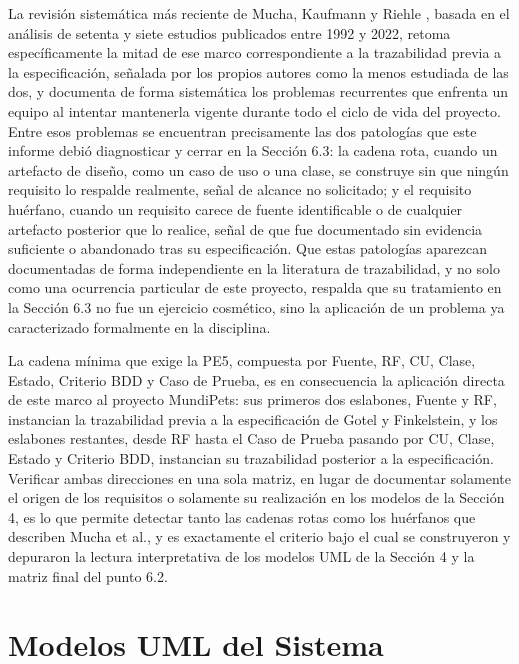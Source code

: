 \documentclass[journal,onecolumn]{IEEEtran}
\begin{document}
La revisión sistemática más reciente de Mucha, Kaufmann y Riehle
\cite{mucha2024}, basada en el análisis de setenta y siete estudios
publicados entre 1992 y 2022, retoma específicamente la mitad de ese
marco correspondiente a la trazabilidad previa a la especificación,
señalada por los propios autores como la menos estudiada de las dos, y
documenta de forma sistemática los problemas recurrentes que enfrenta un
equipo al intentar mantenerla vigente durante todo el ciclo de vida del
proyecto. Entre esos problemas se encuentran precisamente las dos
patologías que este informe debió diagnosticar y cerrar en la Sección
6.3: la cadena rota, cuando un artefacto de diseño, como un caso de uso
o una clase, se construye sin que ningún requisito lo respalde
realmente, señal de alcance no solicitado; y el requisito huérfano,
cuando un requisito carece de fuente identificable o de cualquier
artefacto posterior que lo realice, señal de que fue documentado sin
evidencia suficiente o abandonado tras su especificación. Que estas
patologías aparezcan documentadas de forma independiente en la
literatura de trazabilidad, y no solo como una ocurrencia particular de
este proyecto, respalda que su tratamiento en la Sección 6.3 no fue un
ejercicio cosmético, sino la aplicación de un problema ya caracterizado
formalmente en la disciplina.

La cadena mínima que exige la PE5, compuesta por Fuente, RF, CU, Clase,
Estado, Criterio BDD y Caso de Prueba, es en consecuencia la aplicación
directa de este marco al proyecto MundiPets: sus primeros dos eslabones,
Fuente y RF, instancian la trazabilidad previa a la especificación de
Gotel y Finkelstein, y los eslabones restantes, desde RF hasta el Caso
de Prueba pasando por CU, Clase, Estado y Criterio BDD, instancian su
trazabilidad posterior a la especificación. Verificar ambas direcciones
en una sola matriz, en lugar de documentar solamente el origen de los
requisitos o solamente su realización en los modelos de la Sección 4, es
lo que permite detectar tanto las cadenas rotas como los huérfanos que
describen Mucha et al., y es exactamente el criterio bajo el cual se
construyeron y depuraron la lectura interpretativa de los modelos UML de
la Sección 4 y la matriz final del punto 6.2.

\newpage

\section{Modelos UML del Sistema}
	
\end{document}
